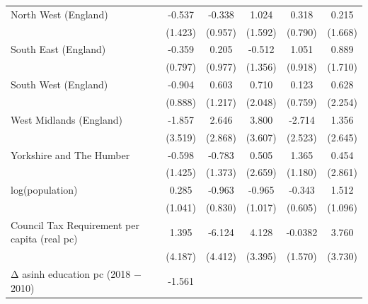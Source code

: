\begin{table}[htbp]
\begin{tabular}{l*{5}{c}}
\addlinespace
North West (England)&      -0.537         &      -0.338         &       1.024         &       0.318         &       0.215         \\
                    &     (1.423)         &     (0.957)         &     (1.592)         &     (0.790)         &     (1.668)         \\
\addlinespace
South East (England)&      -0.359         &       0.205         &      -0.512         &       1.051         &       0.889         \\
                    &     (0.797)         &     (0.977)         &     (1.356)         &     (0.918)         &     (1.710)         \\
\addlinespace
South West (England)&      -0.904         &       0.603         &       0.710         &       0.123         &       0.628         \\
                    &     (0.888)         &     (1.217)         &     (2.048)         &     (0.759)         &     (2.254)         \\
\addlinespace
West Midlands (England)&      -1.857         &       2.646         &       3.800         &      -2.714         &       1.356         \\
                    &     (3.519)         &     (2.868)         &     (3.607)         &     (2.523)         &     (2.645)         \\
\addlinespace
Yorkshire and The Humber&      -0.598         &      -0.783         &       0.505         &       1.365         &       0.454         \\
                    &     (1.425)         &     (1.373)         &     (2.659)         &     (1.180)         &     (2.861)         \\
\addlinespace
log(population)     &       0.285         &      -0.963         &      -0.965         &      -0.343         &       1.512         \\
                    &     (1.041)         &     (0.830)         &     (1.017)         &     (0.605)         &     (1.096)         \\
\addlinespace
Council Tax Requirement per capita (real pc)&       1.395         &      -6.124         &       4.128         &     -0.0382         &       3.760         \\
                    &     (4.187)         &     (4.412)         &     (3.395)         &     (1.570)         &     (3.730)         \\
\addlinespace
Δ asinh education pc (2018 − 2010)&      -1.561         &                     &                     &                     &                     \\

\end{tabular}
\end{table}
